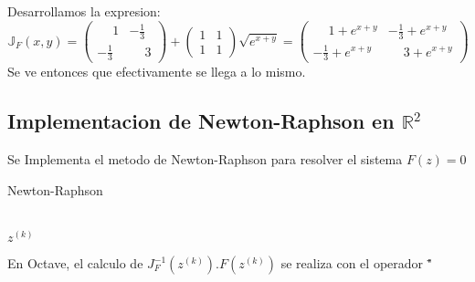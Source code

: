 \documentclass{article}
\begin{document}
    Desarrollamos la expresion:
    \begin{equation}
        \mathbb{J}_F(x,y) = 
        \begin{pmatrix}
            \phantom{-}1 & -\frac{1}{3} \\
            -\frac{1}{3} & \phantom{-}3
        \end{pmatrix}
        +
        \begin{pmatrix} 1 & 1 \\ 1 & 1 \end{pmatrix} \sqrt{e^{x+y}}
        =
        \begin{pmatrix}
            \phantom{-}1 + e^{x+y} & -\frac{1}{3} + e^{x+y} \\
            -\frac{1}{3} + e^{x+y} & \phantom{-}3 + e^{x+y}
        \end{pmatrix}
    \end{equation}
    Se ve entonces que efectivamente se llega a lo mismo.

    \subsection{Implementacion de Newton-Raphson en $\mathbb{R}^2$}
    Se Implementa el metodo de Newton-Raphson para resolver el sistema $F(z) = 0$
    \begin{algorithm}[H]
        \caption{Newton-Raphson}\label{NR1}
        \small
        \centering
        \begin{algorithmic}[1]
        \EndFor \\
        \Return $z^{(k)}$
        \end{algorithmic}
    \end{algorithm}
    En Octave, el calculo de $J^{-1}_F(z^{(k)}).F(z^{(k)})$ se realiza con el operador "\"
    \subsection{}

    \subsection{}

    \subsection{}
\end{document}
